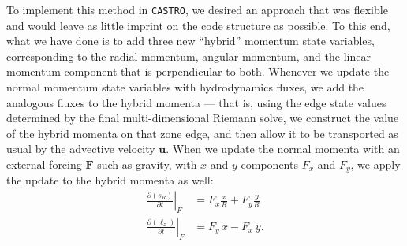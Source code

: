 \documentclass[twocolumn,numberedappendix]{../aastex60}
\newcommand{\castro}{\texttt{CASTRO}}
\begin{document}
To implement this method in \castro, we desired an approach that was flexible
and would leave as little imprint on the code structure as possible.
To this end, what we have done is to add three new ``hybrid'' momentum state
variables, corresponding to the radial momentum, angular momentum, and the linear
momentum component that is perpendicular to both. Whenever we update the normal
momentum state variables with hydrodynamics fluxes, we add the analogous fluxes
to the hybrid momenta --- that is, using the edge state values determined by the
final multi-dimensional Riemann solve, we construct the value of the hybrid
momenta on that zone edge, and then allow it to be transported as usual by the
advective velocity $\mathbf{u}$. When we update the normal momenta with an
external forcing $\mathbf{F}$ such as gravity, with $x$ and $y$
components $F_x$ and $F_y$, we apply the update to the hybrid momenta as well:
\begin{align}
  \left.\frac{\partial(s_R)}{\partial t}\right|_{F} &= F_x \frac{x}{R} + F_y\frac{y}{R} \label{eq:force-radial}\\
  \left.\frac{\partial(\ell_z)}{\partial t}\right|_{F} &= F_y\, x - F_x\, y.\label{eq:force-angular}
  \end{align}
\end{document}
